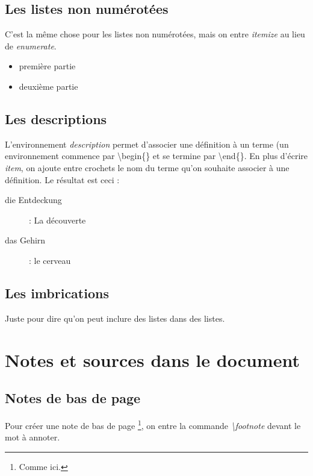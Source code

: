 \documentclass[a4paper,  10pt]{book}
\begin{document}
\subsection{Les listes non numérotées}

C'est la même chose pour les listes non numérotées, mais on entre \emph{itemize} au lieu de \emph{enumerate}.
\begin{itemize}

\item première partie
\item deuxième partie

\end{itemize}

\subsection{Les descriptions}

L'environnement \emph{description} permet d'associer une définition à un terme (un environnement commence par \textbackslash begin\{\} et se termine par \textbackslash end\{\}.  
En plus d'écrire \emph{item}, on ajoute entre crochets le nom du terme qu'on souhaite associer à une définition. Le résultat est ceci :
\begin{description}

\item[die Entdeckung] : La découverte
\item[das Gehirn] : le cerveau

\end{description}



\subsection{Les imbrications}

Juste pour dire qu'on peut inclure des listes dans des listes.

\section{Notes et sources dans le document}
\subsection{Notes de bas de page}

Pour créer une note de bas de page \footnote{Comme ici.}, on entre la commande \emph{\textbackslash footnote} devant le mot à annoter. 
\end{document}
